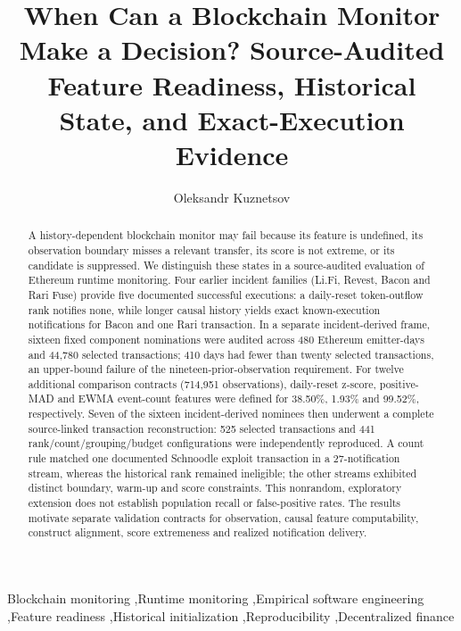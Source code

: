 \documentclass[preprint,12pt,authoryear]{elsarticle}
\begin{document}
\begin{frontmatter}
\title{When Can a Blockchain Monitor Make a Decision? Source-Audited Feature Readiness, Historical State, and Exact-Execution Evidence}
\author[aff1,aff2]{Oleksandr Kuznetsov}
\address[aff1]{Department of Theoretical and Applied Sciences, eCampus University, Italy}
\address[aff2]{Department of Intelligent Software Systems and Technologies, School of Computer Science and Artificial Intelligence, V.~N. Karazin Kharkiv National University, Ukraine}
\begin{abstract}
A history-dependent blockchain monitor may fail because its feature is undefined, its observation boundary misses a relevant transfer, its score is not extreme, or its candidate is suppressed. We distinguish these states in a source-audited evaluation of Ethereum runtime monitoring. Four earlier incident families (Li.Fi, Revest, Bacon and Rari Fuse) provide five documented successful executions: a daily-reset token-outflow rank notifies none, while longer causal history yields exact known-execution notifications for Bacon and one Rari transaction. In a separate incident-derived frame, sixteen fixed component nominations were audited across 480 Ethereum emitter-days and 44,780 selected transactions; 410 days had fewer than twenty selected transactions, an upper-bound failure of the nineteen-prior-observation requirement. For twelve additional comparison contracts (714,951 observations), daily-reset z-score, positive-MAD and EWMA event-count features were defined for 38.50\%, 1.93\% and 99.52\%, respectively. Seven of the sixteen incident-derived nominees then underwent a complete source-linked transaction reconstruction: 525 selected transactions and 441 rank/count/grouping/budget configurations were independently reproduced. A count rule matched one documented Schnoodle exploit transaction in a 27-notification stream, whereas the historical rank remained ineligible; the other streams exhibited distinct boundary, warm-up and score constraints. This nonrandom, exploratory extension does not establish population recall or false-positive rates. The results motivate separate validation contracts for observation, causal feature computability, construct alignment, score extremeness and realized notification delivery.
\end{abstract}
\begin{keyword}
Blockchain monitoring \sep Runtime monitoring \sep Empirical software engineering \sep Feature readiness \sep Historical initialization \sep Reproducibility \sep Decentralized finance
\end{keyword}
\end{frontmatter}
\end{document}

